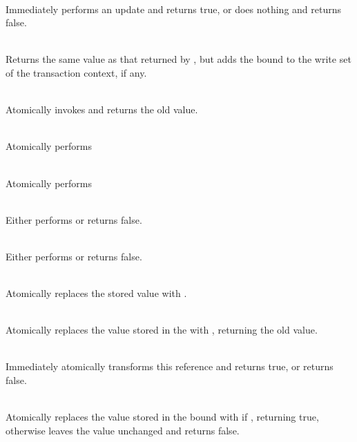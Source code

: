 {\code{): }\\ Immediately
performs an update and returns true, or does nothing and returns false.

\vspace{3pt}

\\ Returns the same value as
that returned by , but adds the bound  to the write
set of the transaction context, if any.

\code{): }\\ Atomically
invokes  and returns the old value.

\code{): }\\
Atomically performs
\code{ \}}

\code{): }\\
Atomically performs
\code{ \}}

\code{): }\\
Either performs  or returns false.

\code{): }\\
Either performs  or returns false.

\code{ => }\code{) }\\
Atomically replaces the stored value  with .

\code{ => }\code{): }\\
Atomically replaces the value  stored in the 
with , returning the old value.

\code{ => }\code{): } \\
Immediately atomically transforms this reference and returns true,
or returns false.

\code{[}\code{,}\code{]):}
\\
Atomically replaces the value  stored in the bound 
with  if , returning true, otherwise
leaves the value unchanged and returns false.

}

